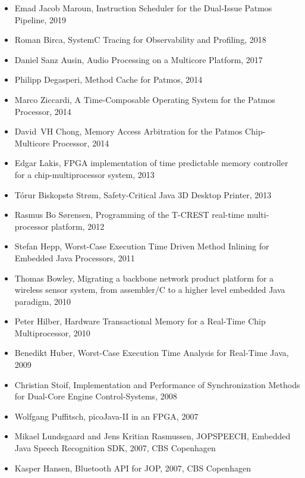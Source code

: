 \documentclass[%
    a4paper,
    11pt, %
    headinclude, footexclude,
    notitlepage,
    headsepline,
    pointlessnumbers,
    ]{scrartcl}
\begin{document}
\begin{itemize}

\item Emad Jacob Maroun, Instruction Scheduler for the Dual-Issue Patmos Pipeline, 2019
\item Roman Birca, SystemC Tracing for Observability and Profiling, 2018
\item Daniel Sanz Ausin, Audio Processing on a Multicore Platform, 2017
\item Philipp Degasperi, Method Cache for Patmos, 2014
\item Marco Ziccardi, A Time-Composable Operating System for the Patmos Processor, 2014
\item David~VH Chong, Memory Access Arbitration for the Patmos Chip-Multicore Processor, 2014
\item Edgar Lakis, FPGA implementation of time predictable memory controller for a chip-multiprocessor system, 2013
  \item T\'{o}rur Biskopst\o{} Str\o{}m, Safety-Critical Java 3D Desktop Printer, 2013
  \item Rasmus Bo S{\o}rensen, Programming of the T-CREST real-time multi-processor platform, 2012
  \item Stefan Hepp, Worst-Case Execution Time Driven Method Inlining for Embedded Java Processors, 2011
  \item Thomas Bowley, Migrating a backbone network product platform for a wireless sensor system, from assembler/C to a higher level embedded Java paradigm, 2010
  \item Peter Hilber, Hardware Transactional Memory for a
      Real-Time Chip Multiprocessor, 2010
  \item Benedikt Huber, Worst-Case Execution Time Analysis for
      Real-Time {Java}, 2009
  \item Christian Stoif, Implementation and Performance of
      Synchronization Methods for Dual-Core Engine
      Control-Systems, 2008
  \item Wolfgang Puffitsch, {picoJava-II} in an {FPGA}, 2007
  \item Mikael Lundsgaard and Jens Kritian Rasmussen, JOPSPEECH,
      Embedded Java Speech Recognition SDK, 2007, CBS Copenhagen
  \item Kasper Hansen, Bluetooth API for JOP, 2007, CBS
      Copenhagen
\end{itemize}

\end{document}
